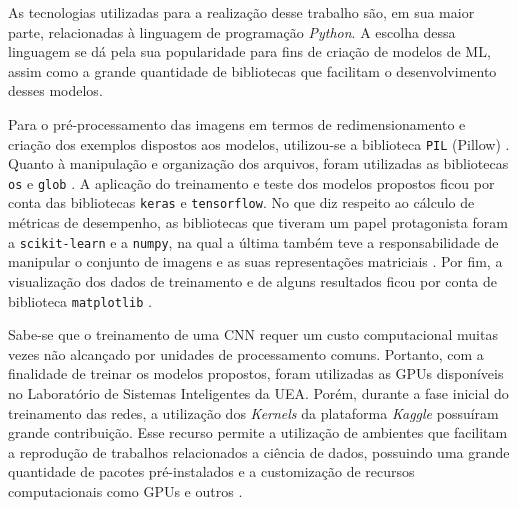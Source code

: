
As tecnologias utilizadas para a realização desse trabalho são, em sua maior parte, relacionadas à linguagem de programação \emph{Python}. A escolha dessa linguagem se dá pela sua popularidade para fins de criação de modelos de ML, assim como a grande quantidade de bibliotecas que facilitam o desenvolvimento desses modelos.

Para o pré-processamento das imagens em termos de redimensionamento e criação dos exemplos dispostos aos modelos, utilizou-se a biblioteca \texttt{PIL} (Pillow) \cite{pillow}. Quanto à manipulação e organização dos arquivos, foram utilizadas as bibliotecas \texttt{os} e \texttt{glob} \cite{os,glob}. A aplicação do treinamento e teste dos modelos propostos ficou por conta das bibliotecas \texttt{keras} e \texttt{tensorflow}\cite{keras, tensorflow}. No que diz respeito ao cálculo de métricas de desempenho, as bibliotecas que tiveram um papel protagonista foram a \texttt{scikit-learn} e a \texttt{numpy}, na qual a última também teve a responsabilidade de manipular o conjunto de imagens e as suas representações matriciais \cite{sklearn,numpy}. Por fim, a visualização dos dados de treinamento e de alguns resultados ficou por conta de biblioteca \texttt{matplotlib} \cite{matplotlib}.

Sabe-se que o treinamento de uma CNN requer um custo computacional muitas vezes não alcançado por unidades de processamento comuns. Portanto, com a finalidade de treinar os modelos propostos, foram utilizadas as GPUs disponíveis no Laboratório de Sistemas Inteligentes da UEA. Porém, durante a fase inicial do treinamento das redes, a utilização dos \emph{Kernels} da plataforma \emph{Kaggle} possuíram grande contribuição. Esse recurso permite a utilização de ambientes que facilitam a reprodução de trabalhos relacionados a ciência de dados, possuindo uma grande quantidade de pacotes pré-instalados e a customização de recursos computacionais como GPUs e outros \cite{kaggle}.
